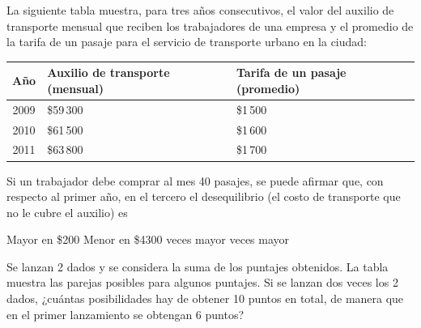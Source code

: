 \documentclass[10pt,letterpaper,addpoints]{exam}
\begin{document}
\begin{multicols}{2}
\begin{questions}
\question La siguiente tabla muestra, para tres años consecutivos, el valor del auxilio de transporte mensual que reciben los trabajadores de una empresa y el promedio de la tarifa de un pasaje para el servicio de transporte urbano en la ciudad:
\begin{center}
\begin{tabular}{|c|p{3cm}|p{3cm}|}
\hline 
\textbf{Año} & \textbf{Auxilio de transporte} (mensual) & \textbf{Tarifa de un pasaje} (promedio)\\ 
\hline 
2009 & \quad \$59\,300 & \quad \$1\,500 \\ 
\hline 
2010 & \quad \$61\,500 & \quad \$1\,600 \\ 
\hline 
2011 & \quad \$63\,800 & \quad \$1\,700 \\ 
\hline 
\end{tabular} 
\end{center}
Si un trabajador debe comprar al mes 40 pasajes, se puede afirmar que, con respecto al primer año, en el tercero el desequilibrio (el costo de transporte que no le cubre el auxilio) es
\begin{choices}
\choice Mayor en \$200
\choice Menor en \$4300
 veces mayor
 veces mayor
\end{choices}
\question Se lanzan 2 dados y se considera la suma de los puntajes obtenidos. La tabla muestra las parejas posibles para algunos puntajes.
Si se lanzan dos veces los 2 dados, ¿cuántas posibilidades hay de obtener 10 puntos en total, de manera que en el primer lanzamiento se obtengan 6 puntos?


\end{questions}
\end{multicols}
\end{document}
